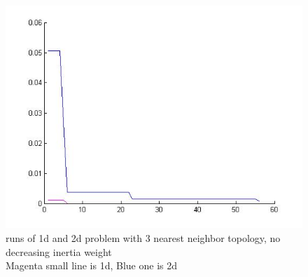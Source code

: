 \documentclass[12pt, a4paper]{article}
\begin{document}
\begin{figure}[H]

\includegraphics[width=\linewidth]{3nn_no_inertia}
\caption{runs of 1d and 2d problem with 3 nearest neighbor topology, no decreasing inertia weight\\
Magenta small line is 1d, Blue one is 2d}


\end{figure}
\end{document}
